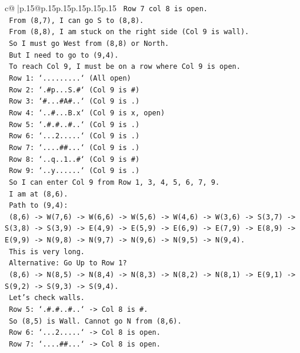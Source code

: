 \documentclass{article}
\begin{document}
{\begin{supertabular}{c@{$\;$}|p{.15\linewidth}@{}p{.15\linewidth}p{.15\linewidth}p{.15\linewidth}p{.15\linewidth}p{.15\linewidth}}
{{{\texttt{   Row 7 col 8 is open.} \\
\texttt{   From (8,7), I can go S to (8,8).} \\
\texttt{   From (8,8), I am stuck on the right side (Col 9 is wall).} \\
\texttt{   So I must go West from (8,8) or North.} \\
\texttt{   But I need to go to (9,4).} \\
\texttt{   To reach Col 9, I must be on a row where Col 9 is open.} \\
\texttt{   Row 1: `.........` (All open)} \\
\texttt{   Row 2: `.\#p...S.\#` (Col 9 is \#)} \\
\texttt{   Row 3: `\#...\#A\#..` (Col 9 is .)} \\
\texttt{   Row 4: `..\#...B.x` (Col 9 is x, open)} \\
\texttt{   Row 5: `.\#.\#..\#..` (Col 9 is .)} \\
\texttt{   Row 6: `...2.....` (Col 9 is .)} \\
\texttt{   Row 7: `....\#\#...` (Col 9 is .)} \\
\texttt{   Row 8: `..q..1..\#` (Col 9 is \#)} \\
\texttt{   Row 9: `..y......` (Col 9 is .)} \\
\texttt{   So I can enter Col 9 from Row 1, 3, 4, 5, 6, 7, 9.} \\
\texttt{   I am at (8,6).} \\
\texttt{   Path to (9,4):} \\
\texttt{   (8,6) {-}> W(7,6) {-}> W(6,6) {-}> W(5,6) {-}> W(4,6) {-}> W(3,6) {-}> S(3,7) {-}> S(3,8) {-}> S(3,9) {-}> E(4,9) {-}> E(5,9) {-}> E(6,9) {-}> E(7,9) {-}> E(8,9) {-}> E(9,9) {-}> N(9,8) {-}> N(9,7) {-}> N(9,6) {-}> N(9,5) {-}> N(9,4).} \\
\texttt{   This is very long.} \\
\texttt{   Alternative: Go Up to Row 1?} \\
\texttt{   (8,6) {-}> N(8,5) {-}> N(8,4) {-}> N(8,3) {-}> N(8,2) {-}> N(8,1) {-}> E(9,1) {-}> S(9,2) {-}> S(9,3) {-}> S(9,4).} \\
\texttt{   Let's check walls.} \\
\texttt{   Row 5: `.\#.\#..\#..` {-}> Col 8 is \#.} \\
\texttt{   So (8,5) is Wall. Cannot go N from (8,6).} \\
\texttt{   Row 6: `...2.....` {-}> Col 8 is open.} \\
\texttt{   Row 7: `....\#\#...` {-}> Col 8 is open.} \\
}}}
\end{supertabular}}
\end{document}
